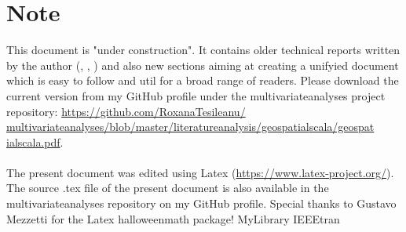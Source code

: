 \documentclass {article}
\begin{document}
\section* {Note}
This document is "under construction". It contains older technical reports written by the author (\cite{tesileanu_using_2017}, \cite{tesileanu_introduction_2017}, \cite{tesileanu_geostatistics_2017}) and also new sections aiming at creating a unifyied document which is easy to follow and util for a broad range of readers.  
Please download the current version from  my GitHub profile under the multivariate\underline{\space}analyses project repository: \href{https://github.com/RoxanaTesileanu/multivariate_analyses/blob/master/literature_analysis/geospatial_scala/geospatial_scala.pdf}{https://github.com/RoxanaTesileanu/\\multivariate\underline{\space}analyses/blob/master/literature\underline{\space}analysis/geospatial\underline{\space}scala/geospat\\ial\underline{\space}scala.pdf}. 
\\
\\
The present document was edited using Latex \cite{claudio_latex-tutorial.com_nodate} (\href{https://www.latex-project.org/}{https://www.latex-project.org/}). The source .tex file of the present document is also available in the multivariate\underline{\space}analyses repository on my GitHub profile. Special thanks to Gustavo Mezzetti for the Latex halloweenmath package!  
 {MyLibrary}
 {IEEEtran}
\end{document}

